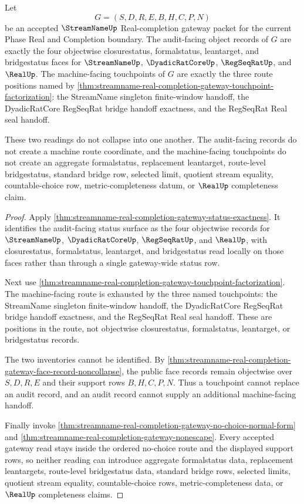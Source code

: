 \begin{theorem}
\label{thm:streamname-real-completion-gateway-audit-touchpoint-separation}
Let
$$
G=(S,D,R,E,B,H,C,P,N)
$$
be an accepted $\StreamNameUp$ Real-completion gateway packet for the current Phase Real and Completion boundary. The audit-facing object records of $G$ are exactly the four objectwise closurestatus, formalstatus, leantarget, and bridgestatus faces for $\StreamNameUp$, $\DyadicRatCoreUp$, $\RegSeqRatUp$, and $\RealUp$. The machine-facing touchpoints of $G$ are exactly the three route positions named by \autoref{thm:streamname-real-completion-gateway-touchpoint-factorization}: the StreamName singleton finite-window handoff, the DyadicRatCore RegSeqRat bridge handoff exactness, and the RegSeqRat Real seal handoff.

These two readings do not collapse into one another. The audit-facing records do not create a machine route coordinate, and the machine-facing touchpoints do not create an aggregate formalstatus, replacement leantarget, route-level bridgestatus, standard bridge row, selected limit, quotient stream equality, countable-choice row, metric-completeness datum, or $\RealUp$ completeness claim.
\end{theorem}
\begin{proof}
Apply \autoref{thm:streamname-real-completion-gateway-status-exactness}. It identifies the audit-facing status surface as the four objectwise records for $\StreamNameUp$, $\DyadicRatCoreUp$, $\RegSeqRatUp$, and $\RealUp$, with closurestatus, formalstatus, leantarget, and bridgestatus read locally on those faces rather than through a single gateway-wide status row.

Next use \autoref{thm:streamname-real-completion-gateway-touchpoint-factorization}. The machine-facing route is exhausted by the three named touchpoints: the StreamName singleton finite-window handoff, the DyadicRatCore RegSeqRat bridge handoff exactness, and the RegSeqRat Real seal handoff. These are positions in the route, not objectwise closurestatus, formalstatus, leantarget, or bridgestatus records.

The two inventories cannot be identified. By \autoref{thm:streamname-real-completion-gateway-face-record-noncollapse}, the public face records remain objectwise over $S,D,R,E$ and their support rows $B,H,C,P,N$. Thus a touchpoint cannot replace an audit record, and an audit record cannot supply an additional machine-facing handoff.

Finally invoke \autoref{thm:streamname-real-completion-gateway-no-choice-normal-form} and \autoref{thm:streamname-real-completion-gateway-nonescape}. Every accepted gateway read stays inside the ordered no-choice route and the displayed support rows, so neither reading can introduce aggregate formalstatus data, replacement leantargets, route-level bridgestatus data, standard bridge rows, selected limits, quotient stream equality, countable-choice rows, metric-completeness data, or $\RealUp$ completeness claims.
\end{proof}
